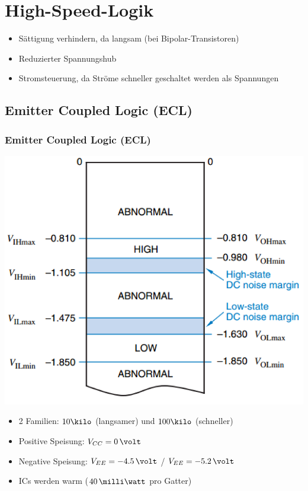 \section{High-Speed-Logik}

\begin{itemize}
    \item Sättigung verhindern, da langsam (bei Bipolar-Transistoren)
    \item Reduzierter Spannungshub
    \item Stromsteuerung, da Ströme schneller geschaltet werden als Spannungen
\end{itemize}


\subsection{Emitter Coupled Logic (ECL)}

\subsubsection{Emitter Coupled Logic (ECL)}

\begin{minipage}[c]{0.3\columnwidth}
    \includegraphics[width=\columnwidth]{images/ECL_logikpegel.png}
\end{minipage}
\hfill
\begin{minipage}[c]{0.68\columnwidth}
    \begin{itemize}
        \item 2 Familien: $10 \kilo$ (langsamer) und $100 \kilo$ (schneller)
        \item Positive Speisung: $V_{CC} = 0 \, \volt$
        \item Negative Speisung: $V_{EE} = -4.5 \, \volt$ / $V_{EE} = -5.2 \, \volt$ 
        \item ICs werden warm ($40 \, \milli \watt$ pro Gatter)
    \end{itemize}
\end{minipage}


